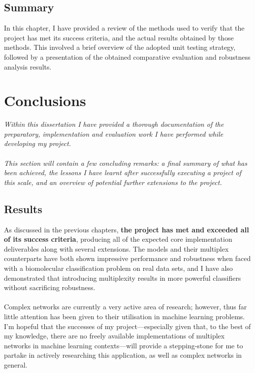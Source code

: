 \documentclass[12pt,a4paper,twoside,openright]{report}
\begin{document}
\section{Summary}

In this chapter, I have provided a review of the methods used to verify that the project has met its success criteria, and the actual results obtained by those methods. This involved a brief overview of the adopted unit testing strategy, followed by a presentation of the obtained comparative evaluation and robustness analysis results.

\chapter{Conclusions}

\emph{Within this dissertation I have provided a thorough documentation of the preparatory, implementation and evaluation work I have performed while developing my project.\\ \\
This section will contain a few concluding remarks: a final summary of what has been achieved, the lessons I have learnt after successfully executing a project of this scale, and an overview of potential further extensions to the project.}

\section{Results}

As discussed in the previous chapters, \textbf{the project has met and exceeded all of its success criteria}, producing all of the expected core implementation deliverables along with several extensions.\!\! The models and their multiplex counterparts have both shown impressive performance and robustness when faced with a biomolecular classification problem on real data sets, and I have also demonstrated that introducing multiplexity results in more powerful classifiers without sacrificing robustness.\\ \\
Complex networks are currently a very active area of research; however, thus far little attention has been given to their utilisation in machine learning problems. I'm hopeful that the successes of my project---especially given that, to the best of my knowledge, there are no freely available implementations of multiplex networks in machine learning contexts---will provide a stepping-stone for me to partake in actively researching this application, as well as complex networks in general.
\end{document}
